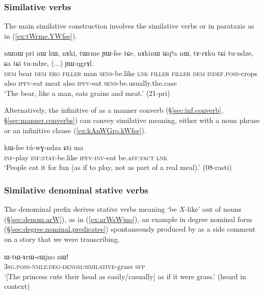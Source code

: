 \subsubsection{Similative verbs} \label{sec:svc.deixis}
The main similative construction involves the similative verbs  or  in parataxis as in (\ref{ex:tWrme.YWfse}).

\begin{exe}
\ex \label{ex:tWrme.YWfse}
\gll nɯnɯ pri nɯ kɯ, nɤki, tɯrme ɲɯ-fse tɕe, nɤkinɯ iɕqʰa nɯ, tɤ-rɤku tɕi tu-ndze, ɕa tɕi tu-ndze, (...)  ɲɯ-ŋgrɤl. \\
\textsc{dem} bear \textsc{dem} \textsc{erg} \textsc{filler} man \textsc{sens}-be.like \textsc{lnk} \textsc{filler} \textsc{filler} \textsc{dem} \textsc{indef}.\textsc{poss}-crops also \textsc{ipfv}-eat meat also \textsc{ipfv}-eat { } \textsc{sens}-be.usually.the.case \\
\glt `The bear, like a man, eats grains and meat.' (21-pri)
\end{exe}

Alternatively, the infinitive  of  as a manner converb (§\ref{sec:inf.converb}, §\ref{sec:manner.converbs}) can convey similative meaning, either with a noun phrase or an infinitive clause (\ref{ex:kAnWGro.kWfse}).

\begin{exe}
\ex \label{ex:kAnWGro.kWfse}
\gll [kɤ-ɤnɯɣro] kɯ-fse tú-wɣ-ndza ɕti ma \\
\textsc{inf}-play \textsc{inf}:\textsc{stat}-be.like \textsc{ipfv}-\textsc{inv}-eat be.\textsc{aff}:\textsc{fact} \textsc{lnk} \\
\glt `People eat it for fun (as if to play, not as part of a real meal).' (08-rasti)
\end{exe}


\subsubsection{Similative denominal stative verbs} \label{sec:denominal:similative}
The denominal prefix  derives stative verbs meaning `be $X$-like' out of nouns (§\ref{sec:denom.arW}), as in (\ref{ex:arWsWjno}), an example in degree nominal form (§\ref{sec:degree.nominal.predicates}) spontaneously produced by  as a side comment on a story that we were transcribing.

\begin{exe}
	\ex \label{ex:arWsWjno}
	\gll  ɯ-tɯ-ɤrɯ-sɯjno nɯ!   \\
	\textsc{3sg}.\textsc{poss}-\textsc{nmlz}:\textsc{deg}-\textsc{denom}:\textsc{similative}-grass \textsc{sfp} \\
	\glt `[The princess cuts their head as easily/casually] as if it were grass.' (heard in context)
\end{exe}

